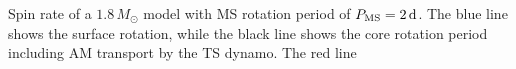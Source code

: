  \label{fig:MRI1.8rot} Spin rate of a $1.8 \, M_\odot$ model with MS rotation period of $P_{\rm MS} = 2 \, {\rm d}$. The blue line shows the surface rotation, while the black line shows the core rotation period including AM transport by the TS dynamo. The red line 